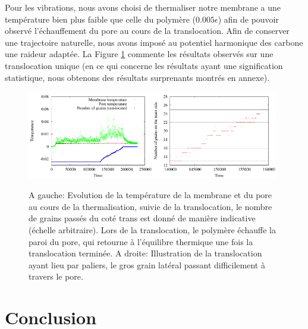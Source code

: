 \documentclass[a4paper,11pt]{article}
\begin{document}
Pour les vibrations, nous avons choisi de thermaliser notre membrane a une température bien plus faible que celle du polymère ($0.005\epsilon$) afin de pouvoir observé l'échauffement du pore au cours de la translocation. Afin de conserver une trajectoire naturelle, nous avons imposé au potentiel harmonique des carbone une raideur adaptée. La Figure \ref{temperature} commente les résultats observés sur une translocation unique (en ce qui concerne les résultats ayant une signification statistique, nous obtenons des résultats surprenants montrés en annexe).
\begin{figure}[H]
\begin{center}
\includegraphics[width=0.49\textwidth]{tempmurmobil.pdf}\includegraphics[width=0.49\textwidth]{murmobil.pdf}

\caption{A gauche: Evolution de la température de la membrane et du pore au cours de la thermalisation, suivie de la translocation, le nombre de grains passés du coté trans est donné de manière indicative (échelle arbitraire). Lors de la translocation, le polymère échauffe la paroi du pore, qui retourne à l'équilibre thermique une fois la translocation terminée. A droite: Illustration de la translocation ayant lieu par paliers, le gros grain latéral passant difficilement à travers le pore.}
\label{temperature}
\end{center}
\end{figure}




\section{Conclusion}
\end{document}
